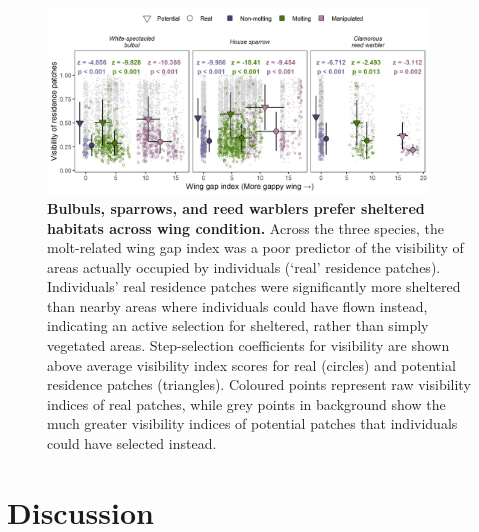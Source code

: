 \begin{refsection}
\begin{figure}%
\centering
\includegraphics[width=0.9\textwidth]{figures/holeybirds/fig_03.png}
\caption{
    \textbf{Bulbuls, sparrows, and reed warblers prefer sheltered habitats across wing condition.}
    Across the three species, the molt-related wing gap index was a poor predictor of the visibility of areas actually occupied by individuals (`real' residence patches).
    Individuals' real residence patches were significantly more sheltered than nearby areas where individuals could have flown instead, indicating an active selection for sheltered, rather than simply vegetated areas.
    Step-selection coefficients for visibility are shown above average visibility index scores for real (circles) and potential residence patches (triangles).
    Coloured points represent raw visibility indices of real patches, while grey points in background show the much greater visibility indices of potential patches that individuals could have selected instead.
}\label{fig_holey_03}
\end{figure}

\section*{Discussion}


\end{refsection}
